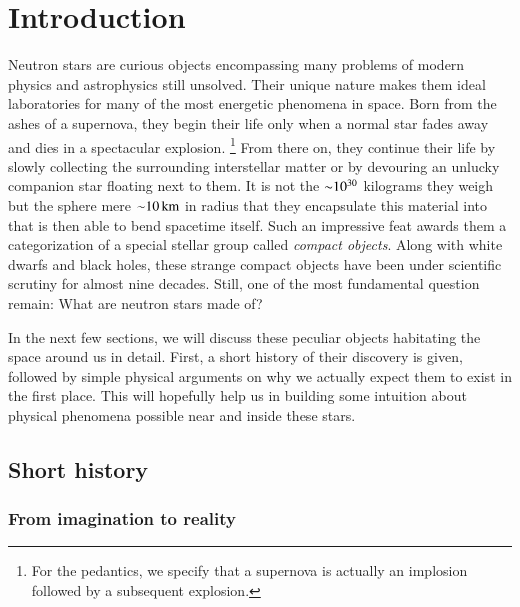 \chapter{Introduction} 

Neutron stars are curious objects encompassing many problems of modern physics and astrophysics still unsolved.
Their unique nature makes them ideal laboratories for many of the most energetic phenomena in space.
Born from the ashes of a supernova, they begin their life only when a normal star fades away and dies in a spectacular explosion.%
\footnote{ For the pedantics, we specify that a supernova is actually an implosion followed by a subsequent explosion.}
From there on, they continue their life by slowly collecting the surrounding interstellar matter or by devouring an unlucky companion star floating next to them.
It is not the $\mathord{\sim} 10^{30}$ kilograms they weigh but the sphere mere $\mathord{\sim} 10 \, \mathrm{km}$ in radius that they encapsulate this material into that is then able to bend spacetime itself.
Such an impressive feat awards them a categorization of a special stellar group called \textit{compact objects}.
Along with white dwarfs and black holes, these strange compact objects have been under scientific scrutiny for almost nine decades.
Still, one of the most fundamental question remain:
What are neutron stars made of?

In the next few sections, we will discuss these peculiar objects habitating the space around us in detail.
First, a short history of their discovery is given, followed by simple physical arguments on why we actually expect them to exist in the first place.
This will hopefully help us in building some intuition about physical phenomena possible near and inside these stars.


\section{Short history}
\subsection{From imagination to reality}

